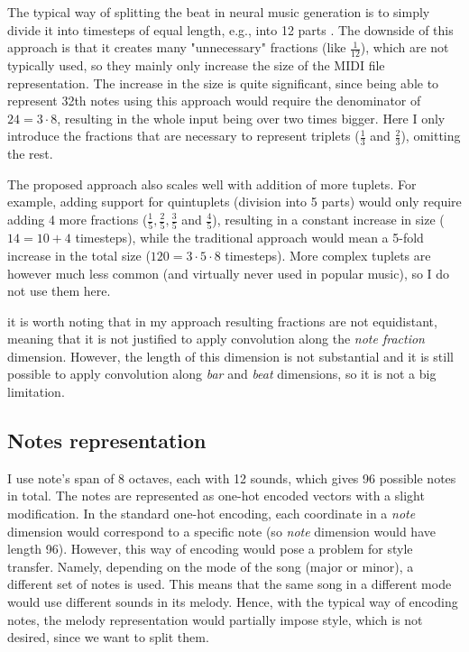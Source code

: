\documentclass[en]{pracamgr}
\begin{document}
The typical way of splitting the beat in neural music generation is to simply divide it into timesteps of equal length, e.g., into 12 parts \cite{clara}.
The downside of this approach is that it creates many "unnecessary" fractions (like $\frac{1}{12}$), which are not typically used, so they mainly only increase the size of the MIDI file representation.
The increase in the size is quite significant, since being able to represent 32th notes using this approach would require the denominator of $24=3\cdot8$, resulting in the whole input being over two times bigger.
Here I only introduce the fractions that are necessary to represent triplets ($\frac{1}{3}$ and $\frac{2}{3}$), omitting the rest.

The proposed approach also scales well with addition of more tuplets.
For example, adding support for quintuplets (division into 5 parts) would only require adding 4 more fractions ($\frac{1}{5}, \frac{2}{5}, \frac{3}{5}$ and $\frac{4}{5}$), resulting in a constant increase in size ($14=10 + 4$ timesteps), while the traditional approach would mean a 5-fold increase in the total size ($120=3\cdot5\cdot8$ timesteps). More complex tuplets are however much less common (and virtually never used in popular music), so I do not use them here.

it is worth noting that in my approach resulting fractions are not equidistant, meaning that it is not justified to apply convolution along the \emph{note fraction} dimension.
However, the length of this dimension is not substantial and it is still possible to apply convolution along \emph{bar} and \emph{beat} dimensions, so it is not a big limitation.

\subsection{Notes representation}

I use note's span of 8 octaves, each with 12 sounds, which gives 96 possible notes in total.
The notes are represented as one-hot encoded vectors with a slight modification.
In the standard one-hot encoding, each coordinate in a \emph{note} dimension would correspond to a specific note (so \emph{note} dimension would have length 96).
However, this way of encoding would pose a problem for style transfer.
Namely, depending on the mode of the song (major or minor), a different set of notes is used.
This means that the same song in a different mode would use different sounds in its melody.
Hence, with the typical way of encoding notes, the melody representation would partially impose style, which is not desired, since we want to split them.
\end{document}

